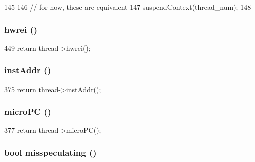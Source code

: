 \begin{DoxyCode}
145 {
146     // for now, these are equivalent
147     suspendContext(thread_num);
148 }
\end{DoxyCode}
\hypertarget{classBaseSimpleCPU_a5f42e07ae335dff417664e91518c7f1e}{
\subsubsection[{hwrei}]{ hwrei ()}}
\label{classBaseSimpleCPU_a5f42e07ae335dff417664e91518c7f1e}



\begin{DoxyCode}
449 { return thread->hwrei(); }
\end{DoxyCode}
\hypertarget{classBaseSimpleCPU_a53c92716db281ae16ffb693c6d7803c7}{
\subsubsection[{instAddr}]{ instAddr ()}}
\label{classBaseSimpleCPU_a53c92716db281ae16ffb693c6d7803c7}



\begin{DoxyCode}
375 { return thread->instAddr(); }
\end{DoxyCode}
\hypertarget{classBaseSimpleCPU_a1a21696f33a7d38f251687ae0b5e9718}{
\subsubsection[{microPC}]{ microPC ()}}
\label{classBaseSimpleCPU_a1a21696f33a7d38f251687ae0b5e9718}



\begin{DoxyCode}
377 { return thread->microPC(); }
\end{DoxyCode}
\hypertarget{classBaseSimpleCPU_a99768639c728ee835cce54b8b42b3d8f}{
\subsubsection[{misspeculating}]{\setlength{\rightskip}{0pt plus 5cm}bool misspeculating ()}}
\label{classBaseSimpleCPU_a99768639c728ee835cce54b8b42b3d8f}




